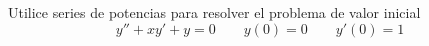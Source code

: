 \item Utilice series de potencias para resolver el problema de valor inicial
    \[ y'' + xy' + y = 0 \qquad y(0) = 0 \qquad y'(0) = 1 \]
